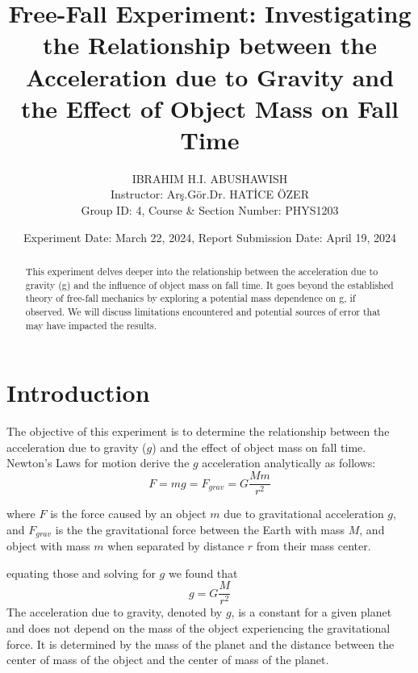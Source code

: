 \documentclass[journal]{IEEEtran}
\begin{document}
\title{Free-Fall Experiment: Investigating the Relationship between the Acceleration due to Gravity and the Effect of Object Mass on Fall Time}
\author{IBRAHIM H.I. ABUSHAWISH\\ Instructor: Arş.Gör.Dr. HATİCE ÖZER\\ Group ID: 4, Course \& Section Number: PHYS1203}

\date{Experiment Date: March 22, 2024, Report Submission Date: April 19, 2024}

\maketitle

\begin{abstract}
This experiment delves deeper into the relationship between the acceleration due to gravity (g) and the influence of object mass on fall time. It goes beyond the established theory of free-fall mechanics by exploring a potential mass dependence on g, if observed. We will discuss limitations encountered and potential sources of error that may have impacted the results.

\end{abstract}

\section{Introduction}
The objective of this experiment is to determine the relationship between the acceleration due to gravity ($g$) and the effect of object mass on fall time. Newton's Laws for motion derive the $g$ acceleration analytically as follows: 
\begin{equation}
    F = mg = F_{grav} = G \frac{Mm}{r^2}
\end{equation}

where $F$ is the force caused by an object $m$ due to gravitational acceleration $g$, and $F_{grav}$ is the the gravitational force between the Earth with mass $M$, and object with mass $m$ when separated by distance $r$ from their mass center. 

equating those and solving for $g$ we found that
\begin{equation}
    g = G \frac{M}{r^2}
\end{equation}
The acceleration due to gravity, denoted by $g$, is a constant for a given planet and does not depend on the mass of the object experiencing the gravitational force. It is determined by the mass of the planet and the distance between the center of mass of the object and the center of mass of the planet.
\end{document}
